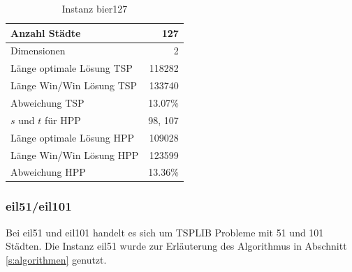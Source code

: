 \documentclass[11pt,a4paper]{article}
\begin{document}
        \begin{table}[H]
                \centering
                \begin{tabular}{| l | r |}
                    \hline
                        Anzahl Städte               & 127           \\ \hline
                        Dimensionen                 & 2             \\ \hline
                        Länge optimale Lösung TSP   & 118282        \\ \hline
                        Länge Win/Win Lösung  TSP   & 133740        \\ \hline
                        Abweichung TSP              & 13.07\%       \\ \hline
                        $s$ und $t$ für HPP         & 98, 107       \\ \hline
                        Länge optimale Lösung HPP   & 109028        \\ \hline
                        Länge Win/Win Lösung  HPP   & 123599        \\ \hline
                        Abweichung HPP              & 13.36\%       \\ \hline
                \end{tabular}
                \caption{Instanz bier127}
                \label{tab:bier127}
        \end{table}

\subsubsection{eil51/eil101}
Bei eil51 und eil101 handelt es sich um TSPLIB Probleme mit 51 und 101 Städten. Die Instanz eil51 wurde zur Erläuterung des Algorithmus in Abschnitt \ref{s:algorithmen} genutzt.
\end{document}
